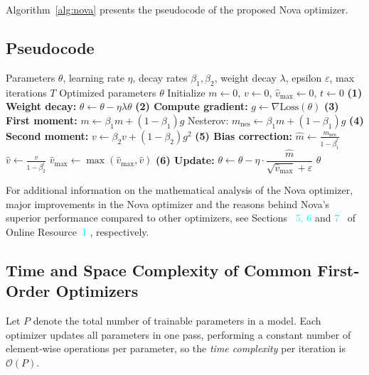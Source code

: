 \documentclass[10pt,twocolumn]{article}
\newcommand{\OnlineReff}[2]{%
  Sections~%
  \textcolor{cyan}{5, 6} and \textcolor{cyan}{7}%
  ~of Online Resource~\textcolor{cyan}{#2}%
}
\begin{document}
Algorithm~\ref{alg:nova} presents the pseudocode of the proposed Nova optimizer.

\subsection{Pseudocode}

\begin{algorithm}[H]
\footnotesize %
\caption{Nova Optimizer}
\label{alg:nova}
\begin{algorithmic}[1]
\Require Parameters $\theta$, learning rate $\eta$, decay rates $\beta_1, \beta_2$, weight decay $\lambda$, epsilon $\varepsilon$, max iterations $T$
\Ensure Optimized parameters $\theta$
\State Initialize $m \gets 0$, $v \gets 0$, $\hat{v}_{\max} \gets 0$, $t \gets 0$
    \State \textbf{(1) Weight decay:} $\theta \gets \theta - \eta \lambda \theta$
    \State \textbf{(2) Compute gradient:} $g \gets \nabla \text{Loss}(\theta)$
    \State \textbf{(3) First moment:} $m \gets \beta_1 m + (1 - \beta_1) g$
    \State Nesterov: $m_{\text{nes}} \gets \beta_1 m + (1 - \beta_1) g$
    \State \textbf{(4) Second moment:} $v \gets \beta_2 v + (1 - \beta_2) g^2$
    \State \textbf{(5) Bias correction:}
    \State \hspace{0.3cm} $\hat{m} \gets \frac{m_{\text{nes}}}{1 - \beta_1^t}$
    \State \hspace{0.3cm} $\hat{v} \gets \frac{v}{1 - \beta_2^t}$
    \State \hspace{0.3cm} $\hat{v}_{\max} \gets \max(\hat{v}_{\max}, \hat{v})$
    \State \textbf{(6) Update:}
    \State \hspace{0.3cm} $\theta \gets \theta - \eta \cdot \dfrac{\hat{m}}{\sqrt{\hat{v}_{\max}} + \varepsilon}$
\EndFor
\State \Return $\theta$
\end{algorithmic}
\end{algorithm}

For additional information on the mathematical analysis of the Nova optimizer, major improvements in the Nova optimizer and the reasons behind Nova's superior performance compared to other optimizers, see \OnlineReff{5, 6,  and 7}{1}, respectively.

\subsection{Time and Space Complexity of Common First‐Order Optimizers}

Let $P$ denote the total number of trainable parameters in a model.  Each optimizer updates all parameters in one pass, performing a constant number of element‐wise operations per parameter, so the \emph{time complexity} per iteration is $ \mathcal{O}(P)$.
 
\end{document}
